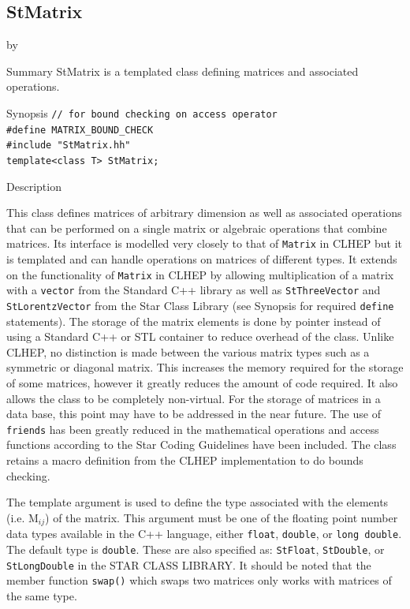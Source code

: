 \documentclass[twoside]{article}
\newcommand{\comp}[1]{\texttt{#1}}%
\newcommand{\entrylabel}[1]{\mbox{\textbf{{#1}}}\hfil}%
\newenvironment{entry}
{\begin{list}{}%
    {\renewcommand{\makelabel}{\entrylabel}%
     \setlength{\labelwidth}{90pt}%
     \setlength{\leftmargin}{\labelwidth}
     \advance\leftmargin by \labelsep%
      }%
    }%
  {\end{list}}
\newcommand{\Entrylabel}[1]%
{\raisebox{0pt}[1ex][0pt]{\makebox[\labelwidth][l]%
    {\parbox[t]{\labelwidth}{\hspace{0pt}\textbf{{#1}}}}}}
\newenvironment{Entry}%
{\renewcommand{\entrylabel}{\Entrylabel}\begin{entry}}%
  {\end{entry}}
\begin{document}
\subsection{StMatrix } \label{StMatrix}
\begin{Entry}
\item[Summary]
    StMatrix is a templated class defining
    matrices and associated operations.

\item[Synopsis]
  \verb+// for bound checking on access operator+\\
  \verb+#define MATRIX_BOUND_CHECK+ \\
  \verb+#include "StMatrix.hh"+ \\
  \verb+template<class T> StMatrix;+
  
    
\item[Description]   
    
    This class defines matrices of arbitrary dimension as well as
    associated operations that can be performed on a
    single matrix or algebraic operations that combine matrices.
    Its interface is modelled very closely to that of
    \comp{Matrix} in CLHEP  but it is templated and
    can handle operations on matrices of different types.
    It extends on the functionality of \comp{Matrix} in CLHEP
    by allowing multiplication of a matrix with
    a \comp{vector}  from the Standard C++ library
    as well as \comp{StThreeVector} 
    and \comp{StLorentzVector}  from the
    Star Class Library (see Synopsis for required \comp{define} statements).
    The storage of the matrix elements is done
    by pointer instead of using a Standard C++ or STL container to
    reduce overhead of the class.  Unlike CLHEP, no distinction is made
    between the various matrix types such as a symmetric or diagonal
    matrix.  This increases the memory required for the storage
    of some matrices, however it greatly reduces the amount of code required.
    It also allows the class to be completely non-virtual.
    For the storage of matrices in a data base, this point may have to be
    addressed in the near future.
    The use of \comp{friends} has been greatly reduced in the mathematical
    operations and access functions according to the Star Coding Guidelines
     have been included.  The class
    retains a macro definition from the CLHEP implementation to do bounds
    checking.
    
    The template argument is used to define the type associated with
    the elements (i.e. M$_{ij}$) of the matrix.  This argument must
    be one of the floating point number data types available in
    the C++ language, either \comp{float}, \comp{double},
    or \comp{long double}. The default type is \comp{double}.
    These are also specified as:
    \comp{StFloat}, \comp{StDouble}, or \comp{StLongDouble} in
    the STAR CLASS LIBRARY.  It should be noted that the member function
    \comp{swap()} which swaps two matrices only works with matrices of
    the same type.
    

\end{Entry}
\end{document}
